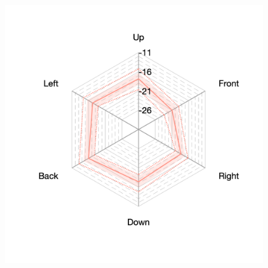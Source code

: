 \documentclass[11pt,a4j]{jreport}
\begin{document}
\begin{figure}[H]
\begin{minipage}[b]{.33\textwidth}
        \label{fig:S06early}
      \end{minipage}%
      \begin{minipage}[b]{.33\textwidth}
        \centering
        \includegraphics[width=1\linewidth]{images/realHallDirSt/early_S05_allhall.png}
        \label{fig:S04early}
      \end{minipage}


\end{figure}
\end{document}

